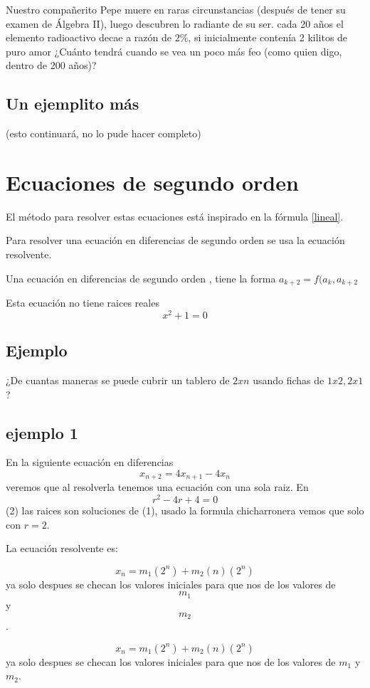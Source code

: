 \documentclass{article}
\begin{document}
Nuestro compañerito Pepe muere en raras circunstancias (después de tener su examen de Álgebra II), luego descubren lo radiante de su ser. cada 20 años el elemento radioactivo decae a razón de $2\%$, si inicialmente contenía 2 kilitos de puro amor ¿Cuánto tendrá cuando se vea un poco más feo (como quien digo, dentro de 200 años)?

\subsection{Un ejemplito más}

(esto continuará, no lo pude hacer completo)

\section{Ecuaciones de segundo orden}

El método para resolver estas ecuaciones está inspirado en la fórmula \ref{lineal}.

Para resolver una ecuación en diferencias de segundo orden se usa la ecuación resolvente.

Una ecuación en diferencias de segundo orden , tiene la forma $a_{k+2}=f(a_k ,a_{k+2}$

Esta ecuación no tiene raices reales $$x^2+1=0$$

\subsection{Ejemplo}

¿De cuantas maneras se puede cubrir un tablero de $2xn$ usando fichas de $1x2,2x1$?

\subsection{ejemplo 1}
En la siguiente ecuación en diferencias
\begin{equation}
  \label{eq:1}
  x_{n+2}=4x_{n+1}-4x_{n}
\end{equation}
 veremos que al resolverla tenemos una ecuación con una sola raiz.
En $$r^2-4r+4=0$$ (2) las raices son soluciones de (1), usado la formula chicharronera vemos que solo con $r=2$.

La ecuaci\'on resolvente es:

$$x_n=m_1(2^n)+m_2(n)(2^n)$$
ya solo despues se checan los valores iniciales para que nos de los valores de $$m_1$$ y $$m_2$$.

$$x_n=m_1(2^n)+m_2(n)(2^n)$$
ya solo despues se checan los valores iniciales para que nos de los valores de $m_1$ y $m_2$.
\end{document}
